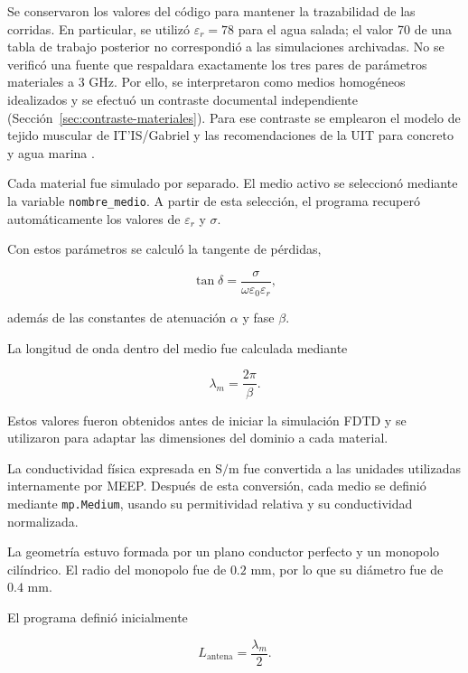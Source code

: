 Se conservaron los valores del código para mantener la trazabilidad de las corridas. En particular, se utilizó $\varepsilon_r=78$ para el agua salada; el valor 70 de una tabla de trabajo posterior no correspondió a las simulaciones archivadas. No se verificó una fuente que respaldara exactamente los tres pares de parámetros materiales a 3 GHz. Por ello, se interpretaron como medios homogéneos idealizados y se efectuó un contraste documental independiente (Sección~\ref{sec:contraste-materiales}). Para ese contraste se emplearon el modelo de tejido muscular de IT'IS/Gabriel y las recomendaciones de la UIT para concreto y agua marina \citep{itis2025materiales,uit2040materiales,uit527materiales}.

Cada material fue simulado por separado. El medio activo se seleccionó mediante la variable \texttt{nombre\_medio}. A partir de esta selección, el programa recuperó automáticamente los valores de $\varepsilon_r$ y $\sigma$.

Con estos parámetros se calculó la tangente de pérdidas,

\begin{equation}
\tan\delta=
\frac{\sigma}
{\omega\varepsilon_0\varepsilon_r},
\end{equation}

además de las constantes de atenuación $\alpha$ y fase $\beta$.

La longitud de onda dentro del medio fue calculada mediante

\begin{equation}
\lambda_m=\frac{2\pi}{\beta}.
\end{equation}

Estos valores fueron obtenidos antes de iniciar la simulación FDTD y se utilizaron para adaptar las dimensiones del dominio a cada material.

La conductividad física expresada en $\mathrm{S/m}$ fue convertida a las unidades utilizadas internamente por MEEP. Después de esta conversión, cada medio se definió mediante \texttt{mp.Medium}, usando su permitividad relativa y su conductividad normalizada.

La geometría estuvo formada por un plano conductor perfecto y un monopolo cilíndrico. El radio del monopolo fue de $0.2$ mm, por lo que su diámetro fue de $0.4$ mm.

El programa definió inicialmente

\begin{equation}
L_{\mathrm{antena}}=\frac{\lambda_m}{2}.
\end{equation}

